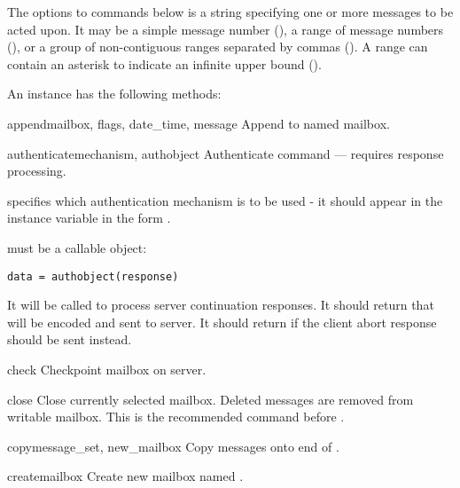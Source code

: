 The  options to commands below is a string specifying one
or more messages to be acted upon.  It may be a simple message number
(), a range of message numbers (), or a group of
non-contiguous ranges separated by commas ().  A range
can contain an asterisk to indicate an infinite upper bound
().

An  instance has the following methods:


\begin{methoddesc}[IMAP4]{append}{mailbox, flags, date_time, message}
  Append  to named mailbox. 
\end{methoddesc}

\begin{methoddesc}[IMAP4]{authenticate}{mechanism, authobject}
  Authenticate command --- requires response processing.

   specifies which authentication mechanism is to be
  used - it should appear in the instance variable 
  in the form .

   must be a callable object:

\begin{verbatim}
data = authobject(response)
\end{verbatim}

  It will be called to process server continuation responses.
  It should return  that will be encoded and sent to server.
  It should return  if the client abort response \samp{*} should
  be sent instead.
\end{methoddesc}

\begin{methoddesc}[IMAP4]{check}{}
  Checkpoint mailbox on server. 
\end{methoddesc}

\begin{methoddesc}[IMAP4]{close}{}
  Close currently selected mailbox. Deleted messages are removed from
  writable mailbox. This is the recommended command before
  .
\end{methoddesc}

\begin{methoddesc}[IMAP4]{copy}{message_set, new_mailbox}
  Copy  messages onto end of . 
\end{methoddesc}

\begin{methoddesc}[IMAP4]{create}{mailbox}
  Create new mailbox named .
\end{methoddesc}

